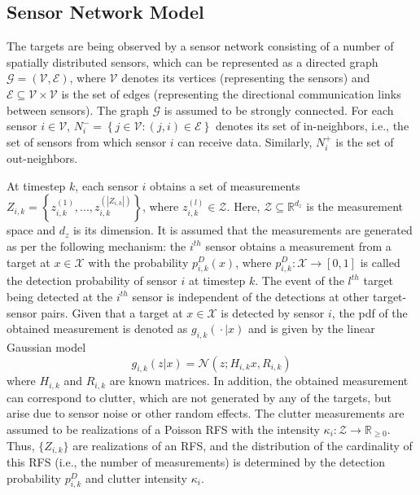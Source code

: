 \subsection{Sensor Network Model}
The targets are being observed by
a sensor network consisting of a number of spatially distributed sensors, which can be represented as a directed graph $\mathcal G=(\mathcal V, \mathcal E)$, where $\mathcal V$ denotes its vertices (representing the sensors) and $\mathcal E \subseteq \mathcal V \times \mathcal V$ is the set of edges (representing the directional communication links between sensors).
The graph $\mathcal G$ is assumed to be strongly connected. 
For each sensor $i \in \mathcal{V}$, ${N}^-_{i} = \left\{ j\in\mathcal{V}: (j,i)\in\mathcal{E} \right\}$ denotes its set of in-neighbors, i.e., the set of sensors from which sensor $i$ can receive data. Similarly, $N^+_i$ is the set of out-neighbors.

At timestep $k$, each sensor $i$ obtains a set of measurements $Z_{i,k} = {\left\{z^{(1)}_{i,k},...,z_{i,k}^{(|Z_{i,k}|)}\right\}}$, where $z_{i,k}^{(l)} \in \mathcal{Z}$. Here, $\mathcal{Z} \subseteq \mathbb{R}^{d_z}$ is the measurement space and $d_z$ is its dimension. It is assumed that the measurements are generated as per the following mechanism: the $i^{th}$ sensor obtains a measurement from a target at $x \in \mathcal X$ with the probability $p^D_{i,k}(x)$, where $p^D_{i,k}:\mathcal X \rightarrow [0,1]$ is called the detection probability of sensor $i$ at timestep $k$. The event of the $l^{th}$ target being detected at the $i^{th}$ sensor is independent of the detections at other target-sensor pairs.
Given that a target at $x \in \mathcal X$ is detected by sensor $i$, the pdf of the obtained measurement is denoted as $g_{i,k}({}\cdot{}|x)$ and is  
given by the linear Gaussian model
\begin{equation}
    g_{i,k}(z|x) = \mathcal N(z; H_{i,k} x, R_{i,k})
    \label{eq:measurement_model}
\end{equation}
where $H_{i,k}$ and $R_{i,k}$ are known matrices.
In addition, the obtained measurement can correspond to clutter, which are not generated by any of the targets, but arise due to sensor noise or other random effects. The clutter measurements are assumed to be realizations of a Poisson RFS with the intensity $\kappa_i:\mathcal Z \rightarrow \mathbb R_{\geq 0}$.
Thus, $\lbrace Z_{i,k} \rbrace$ are realizations of an RFS, and the distribution of the cardinality of this RFS (i.e., the number of measurements) is determined by the detection probability $p^D_{i,k}$ and clutter intensity $\kappa _i$.
